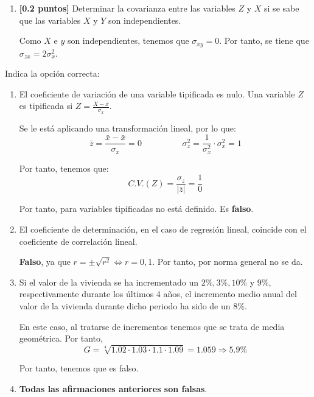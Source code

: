 \documentclass[12pt]{article}
\makeatletter
\def\myitem{\refstepcounter{enumi}\item[\bfseries(\@alph\c@enumi)]}
\makeatother
\begin{document}
\begin{ejercicio}
\begin{enumerate}
\begin{enumerate}
        \item \textbf{[0.2 puntos]} Determinar la covarianza entre las variables $Z$ y $X$ si se sabe que las variables $X$ y $Y$ son independientes.

        Como $X$ e $y$ son independientes, tenemos que $\sigma_{xy}=0$. Por tanto, se tiene que $\sigma_{zx}=2\sigma_x^2$.
    \end{enumerate}
    
    \end{enumerate}
\end{ejercicio}

\begin{ejercicio}
    Indica la opción correcta:

    
    \begin{enumerate}[label=(\alph*)]
        \item El coeficiente de variación de una variable tipificada es nulo. Una variable $Z$ es tipificada si $Z=\frac{X-\bar{x}}{\sigma_x}$.

        Se le está aplicando una transformación lineal, por lo que:
        \begin{equation*}
            \bar{z}=\frac{\bar{x}-\bar{x}}{\sigma_x} = 0
            \hspace{2cm}
            \sigma_z^2 = \frac{1}{\sigma_x^2}\cdot \sigma_x^2 = 1
        \end{equation*}

        Por tanto, tenemos que:
        \begin{equation*}
            C.V.(Z)=\frac{\sigma_z}{|\bar{z}|} = \frac{1}{0}
        \end{equation*}

        Por tanto, para variables tipificadas no está definido. Es \textbf{falso}.

        \item El coeficiente de determinación, en el caso de regresión lineal, coincide con el coeficiente de correlación lineal.

        \textbf{Falso}, ya que $r=\pm \sqrt{r^2}\Longleftrightarrow r=0,1$. Por tanto, por norma general no se da.

        \item Si el valor de la vivienda se ha incrementado un $2\%, 3\%, 10\%$ y $9\%$, respectivamente durante los últimos 4 años, el incremento medio anual del valor de la vivienda durante dicho periodo ha sido de un $8\%$.

        En este caso, al tratarse de incrementos tenemos que se trata de media geométrica. Por tanto,
        \begin{equation*}
            G=\sqrt[4]{1.02\cdot 1.03\cdot 1.1\cdot 1.09}=1.059 \Longrightarrow 5.9\%
        \end{equation*}

        Por tanto, tenemos que es falso.

        \myitem \textbf{Todas las afirmaciones anteriores son falsas}.
    \end{enumerate}
\end{ejercicio}
\end{document}
